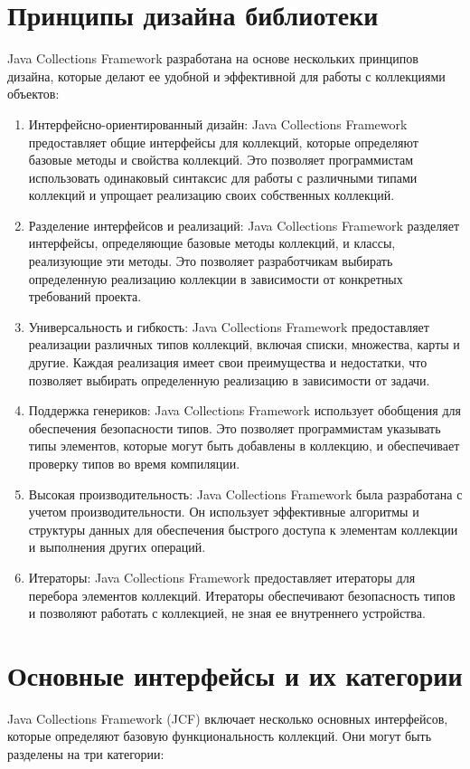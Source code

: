 \section{Принципы дизайна библиотеки}
Java Collections Framework разработана на основе нескольких принципов дизайна, которые делают ее удобной и эффективной для работы с коллекциями объектов:
    \begin{enumerate}
    \item Интерфейсно-ориентированный дизайн: Java Collections Framework предоставляет общие интерфейсы для коллекций, которые определяют базовые методы и свойства коллекций. Это позволяет программистам использовать одинаковый синтаксис для работы с различными типами коллекций и упрощает реализацию своих собственных коллекций.

    \item Разделение интерфейсов и реализаций: Java Collections Framework разделяет интерфейсы, определяющие базовые методы коллекций, и классы, реализующие эти методы. Это позволяет разработчикам выбирать определенную реализацию коллекции в зависимости от конкретных требований проекта.

    \item Универсальность и гибкость: Java Collections Framework предоставляет реализации различных типов коллекций, включая списки, множества, карты и другие. Каждая реализация имеет свои преимущества и недостатки, что позволяет выбирать определенную реализацию в зависимости от задачи.

    \item Поддержка генериков: Java Collections Framework использует обобщения для обеспечения безопасности типов. Это позволяет программистам указывать типы элементов, которые могут быть добавлены в коллекцию, и обеспечивает проверку типов во время компиляции.

    \item Высокая производительность: Java Collections Framework была разработана с учетом производительности. Он использует эффективные алгоритмы и структуры данных для обеспечения быстрого доступа к элементам коллекции и выполнения других операций.

    \item Итераторы: Java Collections Framework предоставляет итераторы для перебора элементов коллекций. Итераторы обеспечивают безопасность типов и позволяют работать с коллекцией, не зная ее внутреннего устройства.
    \end{enumerate}
\section{Основные интерфейсы и их категории}
Java Collections Framework (JCF) включает несколько основных интерфейсов, которые определяют базовую функциональность коллекций. Они могут быть разделены на три категории:

